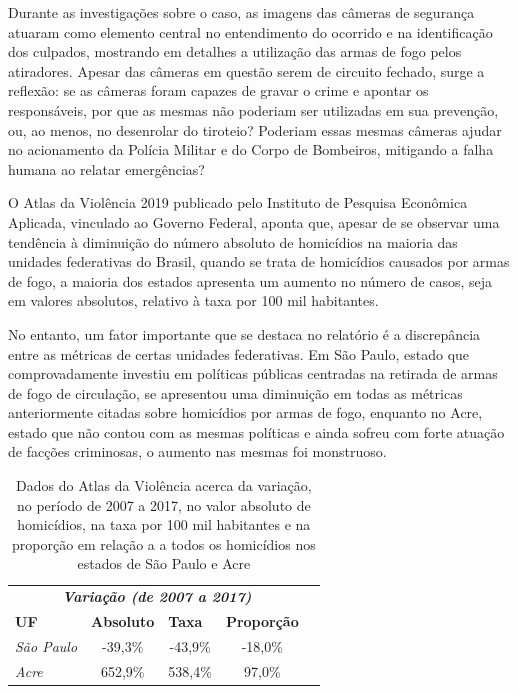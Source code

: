 \documentclass[]{politex}
\begin{document}
Durante as investigações sobre o caso, as imagens das câmeras de segurança atuaram como elemento central no entendimento do ocorrido e na identificação dos culpados, mostrando em detalhes a utilização das armas de fogo pelos atiradores. Apesar das câmeras em questão serem de circuito fechado, surge a reflexão: se as câmeras foram capazes de gravar o crime e apontar os responsáveis, por que as mesmas não poderiam ser utilizadas em sua prevenção, ou, ao menos, no desenrolar do tiroteio? Poderiam essas mesmas câmeras ajudar no acionamento da Polícia Militar e do Corpo de Bombeiros, mitigando a falha humana ao relatar emergências?

O Atlas da Violência 2019\cite{atlasdaviolencia} publicado pelo Instituto de Pesquisa Econômica Aplicada, vinculado ao Governo Federal, aponta que, apesar de se observar uma tendência à diminuição do número absoluto de homicídios na maioria das unidades federativas do Brasil, quando se trata de homicídios causados por armas de fogo, a maioria dos estados apresenta um aumento no número de casos, seja em valores absolutos, relativo à taxa por 100 mil habitantes.

No entanto, um fator importante que se destaca no relatório é a discrepância entre as métricas de certas unidades federativas. Em São Paulo, estado que comprovadamente investiu em políticas públicas centradas na retirada de armas de fogo de circulação, se apresentou uma diminuição em todas as métricas anteriormente citadas sobre homicídios por armas de fogo, enquanto no Acre, estado que não contou com as mesmas políticas e ainda sofreu com forte atuação de facções criminosas, o aumento nas mesmas foi monstruoso.

\begin{table}[ht]
\centering
\begin{tabular}{lcccl}
\cline{1-4}
\multicolumn{4}{c}{\textit{\textbf{Variação (de 2007 a 2017)}}}                                                                                                  &  \\ \cline{1-4}
\multicolumn{1}{|l|}{\textbf{UF}}        & \multicolumn{1}{l|}{\textbf{Absoluto}} & \multicolumn{1}{l|}{\textbf{Taxa}} & \multicolumn{1}{l|}{\textbf{Proporção}} &  \\ \cline{1-4}
\multicolumn{1}{|l|}{\textit{São Paulo}} & \multicolumn{1}{c|}{-39,3\%}           & \multicolumn{1}{c|}{-43,9\%}       & \multicolumn{1}{c|}{-18,0\%}            &  \\ \cline{1-4}
\multicolumn{1}{|l|}{\textit{Acre}}      & \multicolumn{1}{c|}{652,9\%}           & \multicolumn{1}{c|}{538,4\%}       & \multicolumn{1}{c|}{97,0\%}             &  \\ \cline{1-4}
\end{tabular}
\caption{Dados do Atlas da Violência acerca da variação, no período de 2007 a 2017, no valor absoluto de homicídios, na taxa por 100 mil habitantes e na proporção em relação a a todos os homicídios nos estados de São Paulo e Acre}
\label{tbl:atlasdaviolencia}
\end{table}
\end{document}
